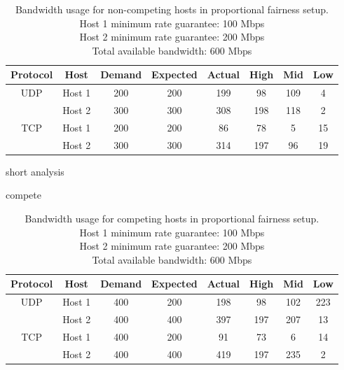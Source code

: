 \documentclass[accepted,single]{gipaper}
\begin{document}
\begin{table}[h]
	\label{prop_nc}
	\vspace{-3mm}
	\begin{center}
		\begin{small}
		\setlength\tabcolsep{1.5pt}
			\begin{tabular}{cccccccc}
				Protocol & Host & Demand & Expected & Actual & High & Mid & Low\\
				\hline
				UDP & Host 1 & 200 & 200 & 199 & 98 & 109 & 4\\
				    & Host 2 & 300 & 300 & 308 & 198 & 118 & 2\\
				\hline
				TCP & Host 1 & 200 & 200 & 86 & 78 & 5 & 15\\
				    & Host 2 & 300 & 300 & 314 & 197 & 96 & 19\\
			\end{tabular}
		\end{small}
	\end{center}
	\caption{Bandwidth usage for non-competing hosts in proportional fairness setup.\\
	Host 1 minimum rate guarantee: 100 Mbps\\
	Host 2 minimum rate guarantee: 200 Mbps\\	
	Total available bandwidth: 600 Mbps}
	\vspace{-3mm}
\end{table}

short analysis

compete

\begin{table}[h]
	\label{prop_c}
	\vspace{-3mm}
	\begin{center}
		\begin{small}
		\setlength\tabcolsep{1.5pt}
			\begin{tabular}{cccccccc}
				Protocol & Host & Demand & Expected & Actual & High & Mid & Low\\
				\hline
				UDP & Host 1 & 400 & 200 & 198 & 98 & 102 & 223\\
				    & Host 2 & 400 & 400 & 397 & 197 & 207 & 13\\
				\hline
				TCP & Host 1 & 400 & 200 & 91 & 73 & 6 & 14\\
				    & Host 2 & 400 & 400 & 419 & 197 & 235 & 2\\
			\end{tabular}
		\end{small}
	\end{center}
	\caption{Bandwidth usage for competing hosts in proportional fairness setup.\\
	Host 1 minimum rate guarantee: 100 Mbps\\
	Host 2 minimum rate guarantee: 200 Mbps\\	
	Total available bandwidth: 600 Mbps}
	\vspace{-3mm}
\end{table}
\end{document}
